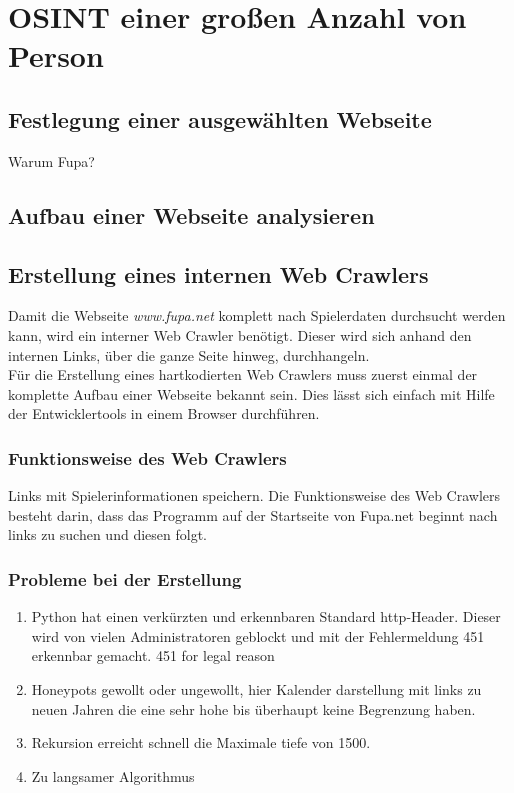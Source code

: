 
\chapter{OSINT einer großen Anzahl von Person}  %
\label{cha:Informationsbeschaffung einer grossen Anzahl von Person} %
\section{Festlegung einer ausgewählten Webseite}
Warum Fupa?
\section{Aufbau einer Webseite analysieren}

\section{Erstellung eines internen Web Crawlers} %
	\label{sse:}
	Damit die Webseite \textit{www.fupa.net} komplett nach Spielerdaten durchsucht werden kann, wird ein interner Web Crawler benötigt. Dieser wird sich anhand den internen Links, über die ganze Seite hinweg, durchhangeln.\\
	Für die Erstellung eines hartkodierten Web Crawlers muss zuerst einmal der komplette Aufbau einer Webseite bekannt sein. Dies lässt sich einfach mit Hilfe der Entwicklertools in einem Browser durchführen. %
	
	\subsection{Funktionsweise des Web Crawlers}
	Links mit Spielerinformationen speichern.
	Die Funktionsweise des Web Crawlers besteht darin, dass das Programm auf der Startseite von Fupa.net beginnt nach links zu suchen und diesen folgt.
	\subsection{Probleme bei der Erstellung} %
	\begin{enumerate}
		\item Python hat einen verkürzten und erkennbaren Standard http-Header. Dieser wird von vielen Administratoren geblockt und mit der Fehlermeldung 451 erkennbar gemacht. 451 for legal reason
		\item Honeypots gewollt oder ungewollt, hier Kalender darstellung mit links zu neuen Jahren die eine sehr hohe bis überhaupt keine Begrenzung haben.
		\item Rekursion erreicht schnell die Maximale tiefe von 1500.
		\item Zu langsamer Algorithmus
	\end{enumerate}
	
